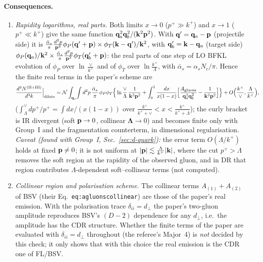 \paragraph{Consequences.}
\begin{enumerate}
\item \emph{Rapidity logarithms, real parts.} Both limits $x\to0$ ($p^+\gg k^+$) and $x\to1$ ($p^+\ll k^+$) give the same function $\mathbf{q}_a^2\mathbf{q}_b^2/(\mathbf{k}^2\mathbf{p}^2)$. With $\mathbf{q}'=\mathbf{q}_a-\mathbf{p}$ (projectile side) it is $\frac{\bar\alpha_s}{\pi}\frac{d^2p}{\mathbf{p}^2}\phi_P(\mathbf{q}'+\mathbf{p})\times\phi_T(\mathbf{k}-\mathbf{q}')/\mathbf{k}^2$, with $\mathbf{q}'_b=\mathbf{k}-\mathbf{q}_a$ (target side) $\phi_P(\mathbf{q}_a)/\mathbf{k}^2\times\frac{\bar\alpha_s}{\pi}\frac{d^2p}{\mathbf{p}^2}\phi_T(\mathbf{q}'_b+\mathbf{p})$: the real parts of one step of LO BFKL evolution of $\phi_P$ over $\ln\frac{\vee}{k^+}$ and of $\phi_T$ over $\ln\frac{k^+}{\Lambda}$, with $\bar\alpha_s=\alpha_sN_c/\pi$. Hence the finite real terms in the paper's scheme are
\begin{align}
\frac{d^3N^{\rm(II+III)}}{d^3k}\Big|_{\rm dilute}=\mathcal N\int_{\mathbf{q}_a}\!\int d^2p\,\frac{\bar\alpha_s}{\pi}\,\phi_P\phi_T\Big\{\ln\frac{\vee}{\Lambda}\,\frac{1}{\mathbf{k}^2\mathbf{p}^2}+\int_0^1\frac{dx}{x(1-x)}\Big[\frac{A_{\rm gluons}}{\mathbf{q}_a^2\mathbf{q}_b^2}-\frac{1}{\mathbf{k}^2\mathbf{p}^2}\Big]\Big\}+O\Big(\frac{k^+}{\vee},\frac{\Lambda}{k^+}\Big),\label{d:realsplit}
\end{align}
($\int_\Lambda^\vee dp^+/p^+=\int dx/(x(1-x))$ over $\frac{k^+}{k^++\vee}<x<\frac{k^+}{k^++\Lambda}$); the curly bracket is IR divergent (soft $\mathbf{p}\to0$, collinear $\boldsymbol\Lambda\to0$) and becomes finite only with Group~I and the fragmentation counterterm, in dimensional regularisation. \emph{Caveat (found with Group~I, Sec.~\ref{sec:d-quark}):} the error term $O(\Lambda/k^+)$ holds at fixed $\mathbf{p}\neq0$; it is not uniform at $|\mathbf{p}|\lesssim\frac{\Lambda}{k^+}|\mathbf{k}|$, where the cut $p^+>\Lambda$ removes the soft region at the rapidity of the observed gluon, and in DR that region contributes $\Lambda$-dependent soft--collinear terms (not computed).
\item \emph{Collinear region and polarisation scheme.} The collinear terms $A_{(1)}+A_{(2)}$ of BSV (their Eq.~\texttt{eq:agluonscollinear}) are those of the paper's real emission. With the polarisation trace $\delta_{ii}=d_\perp$ the paper's two-gluon amplitude reproduces BSV's $(D-2)$ dependence for any $d_\perp$, i.e.\ the amplitude has the CDR structure. Whether the finite terms of the paper are evaluated with $\delta_{ii}=d_\perp$ throughout (the referee's Major~4) is \emph{not} decided by this check; it only shows that with this choice the real emission is the CDR one of FL/BSV.

\end{enumerate}

